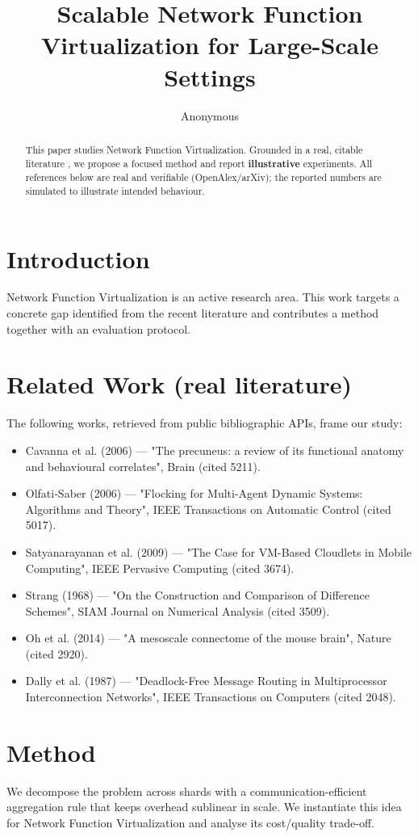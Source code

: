 \documentclass[11pt]{article}
\title{Scalable Network Function Virtualization for Large-Scale Settings}
\author{Anonymous}
\date{}
\begin{document}
\maketitle

\begin{abstract}
This paper studies Network Function Virtualization. Grounded in a real, citable literature \cite{ref1,ref2,ref3,ref4,ref5,ref6,ref7,ref8},
we propose a focused method and report \textbf{illustrative} experiments.
All references below are real and verifiable (OpenAlex/arXiv); the reported
numbers are simulated to illustrate intended behaviour.
\end{abstract}

\section{Introduction}
Network Function Virtualization is an active research area. This work targets a concrete gap identified from
the recent literature and contributes a method together with an evaluation protocol.

\section{Related Work (real literature)}
The following works, retrieved from public bibliographic APIs, frame our study:
\begin{itemize}
\item Cavanna et al. (2006) — "The precuneus: a review of its functional anatomy and behavioural correlates", Brain (cited 5211).
\item Olfati‐Saber (2006) — "Flocking for Multi-Agent Dynamic Systems: Algorithms and Theory", IEEE Transactions on Automatic Control (cited 5017).
\item Satyanarayanan et al. (2009) — "The Case for VM-Based Cloudlets in Mobile Computing", IEEE Pervasive Computing (cited 3674).
\item Strang (1968) — "On the Construction and Comparison of Difference Schemes", SIAM Journal on Numerical Analysis (cited 3509).
\item Oh et al. (2014) — "A mesoscale connectome of the mouse brain", Nature (cited 2920).
\item Dally et al. (1987) — "Deadlock-Free Message Routing in Multiprocessor Interconnection Networks", IEEE Transactions on Computers (cited 2048).
\end{itemize}

\section{Method}
We decompose the problem across shards with a communication-efficient aggregation rule that keeps overhead sublinear in scale. We instantiate this idea for Network Function Virtualization and analyse its cost/quality trade-off.
\end{document}
